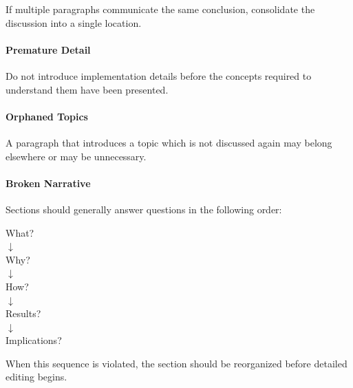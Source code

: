 If multiple paragraphs communicate the same conclusion, consolidate the
discussion into a single location.

\paragraph{Premature Detail}

Do not introduce implementation details before the concepts required to
understand them have been presented.

\paragraph{Orphaned Topics}

A paragraph that introduces a topic which is not discussed again may
belong elsewhere or may be unnecessary.

\paragraph{Broken Narrative}

Sections should generally answer questions in the following order:

\begin{center}
What?\\
$\downarrow$\\
Why?\\
$\downarrow$\\
How?\\
$\downarrow$\\
Results?\\
$\downarrow$\\
Implications?
\end{center}

When this sequence is violated, the section should be reorganized
before detailed editing begins.